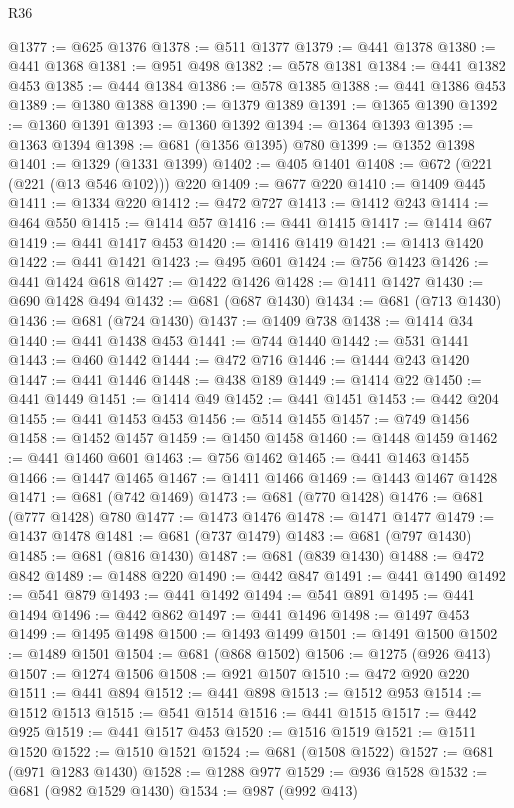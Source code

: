 \begin{lexlean}{R36}
\begin{coremodule}
@1377 := @625 @1376
@1378 := @511 @1377
@1379 := @441 @1378
@1380 := @441 @1368
@1381 := @951 @498
@1382 := @578 @1381
@1384 := @441 @1382 @453
@1385 := @444 @1384
@1386 := @578 @1385
@1388 := @441 @1386 @453
@1389 := @1380 @1388
@1390 := @1379 @1389
@1391 := @1365 @1390
@1392 := @1360 @1391
@1393 := @1360 @1392
@1394 := @1364 @1393
@1395 := @1363 @1394
@1398 := @681 (@1356 @1395) @780
@1399 := @1352 @1398
@1401 := @1329 (@1331 @1399)
@1402 := @405 @1401
@1408 := @672 (@221 (@221 (@13 @546 @102))) @220
@1409 := @677 @220
@1410 := @1409 @445
@1411 := @1334 @220
@1412 := @472 @727
@1413 := @1412 @243
@1414 := @464 @550
@1415 := @1414 @57
@1416 := @441 @1415
@1417 := @1414 @67
@1419 := @441 @1417 @453
@1420 := @1416 @1419
@1421 := @1413 @1420
@1422 := @441 @1421
@1423 := @495 @601
@1424 := @756 @1423
@1426 := @441 @1424 @618
@1427 := @1422 @1426
@1428 := @1411 @1427
@1430 := @690 @1428 @494
@1432 := @681 (@687 @1430)
@1434 := @681 (@713 @1430)
@1436 := @681 (@724 @1430)
@1437 := @1409 @738
@1438 := @1414 @34
@1440 := @441 @1438 @453
@1441 := @744 @1440
@1442 := @531 @1441
@1443 := @460 @1442
@1444 := @472 @716
@1446 := @1444 @243 @1420
@1447 := @441 @1446
@1448 := @438 @189
@1449 := @1414 @22
@1450 := @441 @1449
@1451 := @1414 @49
@1452 := @441 @1451
@1453 := @442 @204
@1455 := @441 @1453 @453
@1456 := @514 @1455
@1457 := @749 @1456
@1458 := @1452 @1457
@1459 := @1450 @1458
@1460 := @1448 @1459
@1462 := @441 @1460 @601
@1463 := @756 @1462
@1465 := @441 @1463 @1455
@1466 := @1447 @1465
@1467 := @1411 @1466
@1469 := @1443 @1467 @1428
@1471 := @681 (@742 @1469)
@1473 := @681 (@770 @1428)
@1476 := @681 (@777 @1428) @780
@1477 := @1473 @1476
@1478 := @1471 @1477
@1479 := @1437 @1478
@1481 := @681 (@737 @1479)
@1483 := @681 (@797 @1430)
@1485 := @681 (@816 @1430)
@1487 := @681 (@839 @1430)
@1488 := @472 @842
@1489 := @1488 @220
@1490 := @442 @847
@1491 := @441 @1490
@1492 := @541 @879
@1493 := @441 @1492
@1494 := @541 @891
@1495 := @441 @1494
@1496 := @442 @862
@1497 := @441 @1496
@1498 := @1497 @453
@1499 := @1495 @1498
@1500 := @1493 @1499
@1501 := @1491 @1500
@1502 := @1489 @1501
@1504 := @681 (@868 @1502)
@1506 := @1275 (@926 @413)
@1507 := @1274 @1506
@1508 := @921 @1507
@1510 := @472 @920 @220
@1511 := @441 @894
@1512 := @441 @898
@1513 := @1512 @953
@1514 := @1512 @1513
@1515 := @541 @1514
@1516 := @441 @1515
@1517 := @442 @925
@1519 := @441 @1517 @453
@1520 := @1516 @1519
@1521 := @1511 @1520
@1522 := @1510 @1521
@1524 := @681 (@1508 @1522)
@1527 := @681 (@971 @1283 @1430)
@1528 := @1288 @977
@1529 := @936 @1528
@1532 := @681 (@982 @1529 @1430)
@1534 := @987 (@992 @413)

\end{coremodule}
\end{lexlean}
